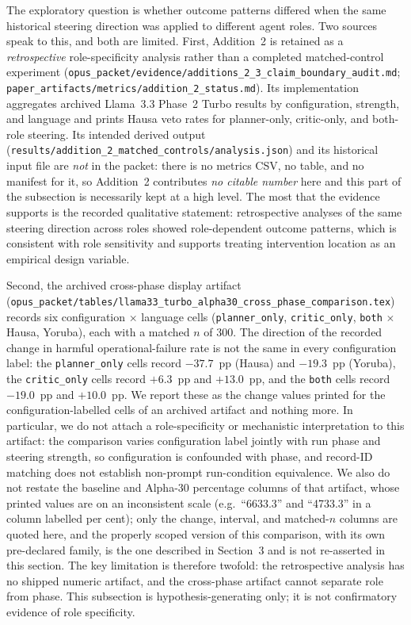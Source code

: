 The exploratory question is whether outcome patterns differed when the same
historical steering direction was applied to different agent roles. Two sources
speak to this, and both are limited. First, Addition~2 is retained as a
\emph{retrospective} role-specificity analysis rather than a completed
matched-control experiment
(\texttt{opus\_packet/evidence/additions\_2\_3\_claim\_boundary\_audit.md};
\texttt{paper\_artifacts/metrics/addition\_2\_status.md}). Its implementation
aggregates archived Llama~3.3 Phase~2 Turbo results by configuration, strength,
and language and prints Hausa veto rates for planner-only, critic-only, and
both-role steering. Its intended derived output
(\texttt{results/addition\_2\_matched\_controls/analysis.json}) and its
historical input file are \emph{not} in the packet: there is no metrics CSV, no
table, and no manifest for it, so Addition~2 contributes \emph{no citable
number} here and this part of the subsection is necessarily kept at a high
level. The most that the evidence supports is the recorded qualitative
statement: retrospective analyses of the same steering direction across roles
showed role-dependent outcome patterns, which is consistent with role
sensitivity and supports treating intervention location as an empirical design
variable.

Second, the archived cross-phase display artifact
(\texttt{opus\_packet/tables/llama33\_turbo\_alpha30\_cross\_phase\_comparison.tex})
records six configuration $\times$ language cells (\texttt{planner\_only},
\texttt{critic\_only}, \texttt{both} $\times$ Hausa, Yoruba), each with a matched
$n$ of 300. The direction of the recorded change in harmful
operational-failure rate is not the same in every configuration label: the
\texttt{planner\_only} cells record $-37.7$~pp (Hausa) and $-19.3$~pp (Yoruba),
the \texttt{critic\_only} cells record $+6.3$~pp and $+13.0$~pp, and the
\texttt{both} cells record $-19.0$~pp and $+10.0$~pp. We report these as the
change values printed for the configuration-labelled cells of an archived
artifact and nothing more. In particular, we do not attach a role-specificity or
mechanistic interpretation to this artifact: the comparison varies configuration
label jointly with run phase and steering strength, so configuration is
confounded with phase, and record-ID matching does not establish non-prompt
run-condition equivalence. We also do not restate the baseline and Alpha-30
percentage columns of that artifact, whose printed values are on an inconsistent
scale (e.g.\ ``6633.3'' and ``4733.3'' in a column labelled per cent); only the
change, interval, and matched-$n$ columns are quoted here, and the properly
scoped version of this comparison, with its own pre-declared family, is the one
described in Section~3 and is not re-asserted in this section. The key
limitation is therefore twofold: the retrospective analysis has no shipped
numeric artifact, and the cross-phase artifact cannot separate role from phase.
This subsection is hypothesis-generating only; it is not confirmatory evidence
of role specificity.

